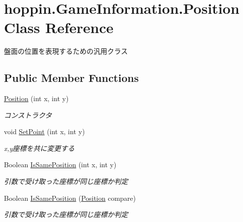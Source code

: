 \hypertarget{classhoppin_1_1_game_information_1_1_position}{}\section{hoppin.\+Game\+Information.\+Position Class Reference}
\label{classhoppin_1_1_game_information_1_1_position}


盤面の位置を表現するための汎用クラス  


\subsection*{Public Member Functions}
\begin{DoxyCompactItemize}
\item 
\hyperlink{classhoppin_1_1_game_information_1_1_position_a0cb47e32779fe10d832e76dbac298956}{Position} (int x, int y)
\begin{DoxyCompactList}\small\item\em コンストラクタ \end{DoxyCompactList}\item 
void \hyperlink{classhoppin_1_1_game_information_1_1_position_a4ddf21df933513ff0a75d466910a1516}{Set\+Point} (int x, int y)
\begin{DoxyCompactList}\small\item\em x,y座標を共に変更する \end{DoxyCompactList}\item 
Boolean \hyperlink{classhoppin_1_1_game_information_1_1_position_a77a5c9a4d0129061a058b651133008fd}{Is\+Same\+Position} (int x, int y)
\begin{DoxyCompactList}\small\item\em 引数で受け取った座標が同じ座標か判定 \end{DoxyCompactList}\item 
Boolean \hyperlink{classhoppin_1_1_game_information_1_1_position_a4c82fddfcdae416613d56e37fb44c31f}{Is\+Same\+Position} (\hyperlink{classhoppin_1_1_game_information_1_1_position}{Position} compare)
\begin{DoxyCompactList}\small\item\em 引数で受け取った座標が同じ座標か判定 \end{DoxyCompactList}\end{DoxyCompactItemize}
